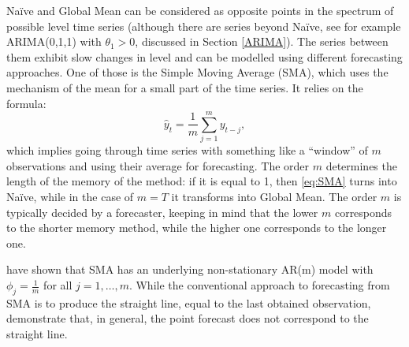 \documentclass[
]{book}
\theoremstyle{definition}
\theoremstyle{definition}
\theoremstyle{definition}
\theoremstyle{definition}
\theoremstyle{remark}
\begin{document}
Naïve and Global Mean can be considered as opposite points in the spectrum of possible level time series (although there are series beyond Naïve, see for example ARIMA(0,1,1) with \(\theta_1>0\), discussed in Section \ref{ARIMA}). The series between them exhibit slow changes in level and can be modelled using different forecasting approaches. One of those is the Simple Moving Average (SMA), which uses the mechanism of the mean for a small part of the time series. It relies on the formula:
\begin{equation}
    \hat{y}_t = \frac{1}{m}\sum_{j=1}^{m} y_{t-j},
    \label{eq:SMA}
\end{equation}
which implies going through time series with something like a ``window'' of \(m\) observations and using their average for forecasting. The order \(m\) determines the length of the memory of the method: if it is equal to 1, then \eqref{eq:SMA} turns into Naïve, while in the case of \(m=T\) it transforms into Global Mean. The order \(m\) is typically decided by a forecaster, keeping in mind that the lower \(m\) corresponds to the shorter memory method, while the higher one corresponds to the longer one.

\citet{Svetunkov2017} have shown that SMA has an underlying non-stationary AR(m) model with \(\phi_j=\frac{1}{m}\) for all \(j=1, \dots, m\). While the conventional approach to forecasting from SMA is to produce the straight line, equal to the last obtained observation, \citet{Svetunkov2017} demonstrate that, in general, the point forecast does not correspond to the straight line.
\end{document}
